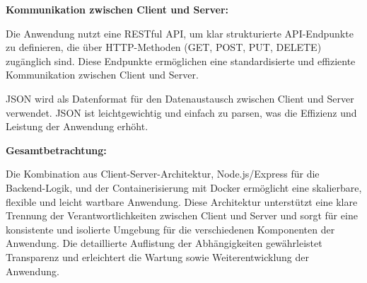 \textbf{Kommunikation zwischen Client und Server:}

Die Anwendung nutzt eine RESTful API, um klar strukturierte API-Endpunkte zu definieren, die über HTTP-Methoden (GET, POST, PUT, DELETE) zugänglich sind.
Diese Endpunkte ermöglichen eine standardisierte und effiziente Kommunikation zwischen Client und Server.

JSON wird als Datenformat für den Datenaustausch zwischen Client und Server verwendet.
JSON ist leichtgewichtig und einfach zu parsen, was die Effizienz und Leistung der Anwendung erhöht.

\textbf{Gesamtbetrachtung:}

Die Kombination aus Client-Server-Architektur, Node.js/Express für die Backend-Logik, und der Containerisierung mit Docker ermöglicht eine skalierbare, flexible und leicht wartbare Anwendung.
Diese Architektur unterstützt eine klare Trennung der Verantwortlichkeiten zwischen Client und Server und sorgt für eine konsistente und isolierte Umgebung für die verschiedenen Komponenten der Anwendung.
Die detaillierte Auflistung der Abhängigkeiten gewährleistet Transparenz und erleichtert die Wartung sowie Weiterentwicklung der Anwendung.
